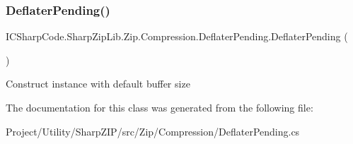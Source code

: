 \subsubsection{\texorpdfstring{Deflater\+Pending()}{DeflaterPending()}\hspace{0.1cm}{\footnotesize\ttfamily [2/2]}}
{\footnotesize\ttfamily I\+C\+Sharp\+Code.\+Sharp\+Zip\+Lib.\+Zip.\+Compression.\+Deflater\+Pending.\+Deflater\+Pending (\begin{DoxyParamCaption}{ }\end{DoxyParamCaption})\hspace{0.3cm}{\ttfamily [inline]}}



Construct instance with default buffer size 



The documentation for this class was generated from the following file\+:\begin{DoxyCompactItemize}
\item 
Project/\+Utility/\+Sharp\+Z\+I\+P/src/\+Zip/\+Compression/Deflater\+Pending.\+cs\end{DoxyCompactItemize}
